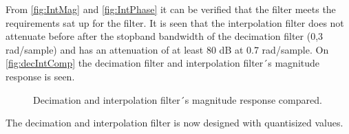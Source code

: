 From \autoref{fig:IntMag} and \autoref{fig:IntPhase} it can be verified that the filter meets the requirements sat up for the filter. It is seen that the interpolation filter does not attenuate before after the stopband bandwidth of the decimation filter (0,3 rad/sample) and has an attenuation of at least 80 dB at 0.7 rad/sample. On \autoref{fig:decIntComp} the decimation filter and interpolation filter´s magnitude response is seen.  

\begin{figure}[H]
	\centering
	
	\caption{Decimation and interpolation filter´s magnitude response compared.}
	\label{fig:decIntComp}
\end{figure}


The decimation and interpolation filter is now designed with quantisized values. %